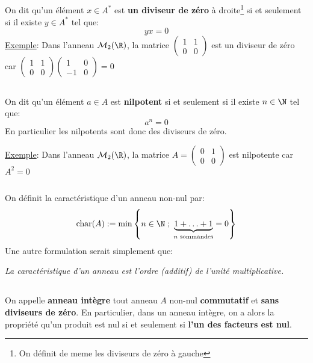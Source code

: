\subsection*{}
On dit qu'un élément \(x \in A^*\) est \textbf{un diviseur de zéro} à droite\footnote[3]{On définit de meme les diviseurs de zéro à gauche} si et seulement si il existe \(y \in A^*\) tel que:
\[
   yx = 0
\]
\underline{Exemple}: Dans l'anneau \(\mathcal{M}_2(\R)\), la matrice \(\begin{pmatrix}1 & 1 \\ 0 & 0\end{pmatrix}\) est un diviseur de zéro car \(\begin{pmatrix}1 & 1 \\ 0 & 0\end{pmatrix}\begin{pmatrix}1 & 0 \\ -1 & 0\end{pmatrix} = 0\)
\subsection*{}
On dit qu'un élément \(a \in A\) est \textbf{nilpotent} si et seulement si il existe \(n \in \N\) tel que:
\[
   a^n = 0
\]
En particulier les nilpotents sont donc des diviseurs de zéro. \<

\underline{Exemple}: Dans l'anneau \(\mathcal{M}_2(\R)\), la matrice \(A = \begin{pmatrix}0 & 1 \\ 0 & 0\end{pmatrix}\) est nilpotente car \(A^2 = 0\)
\subsection*{}
On définit la caractéristique d'un anneau non-nul par:
\[
   \text{char}(A) := \min \left\{ n \in \N \; ; \;\underbrace{1 + \ldots + 1}_{\text{\(n\) sommandes}} = 0 \right\}
\]
Une autre formulation serait simplement que:
\begin{center}
   \textit{La caractéristique d'un anneau est l'ordre (additif) de l'unité multiplicative.}
\end{center}
\subsection*{}
On appelle \textbf{anneau intègre} tout anneau \(A\) non-nul \textbf{commutatif} et \textbf{sans diviseurs de zéro}. En particulier, dans un anneau intègre, on a alors la propriété qu'un produit est nul si et seulement si \textbf{l'un des facteurs est nul}.
